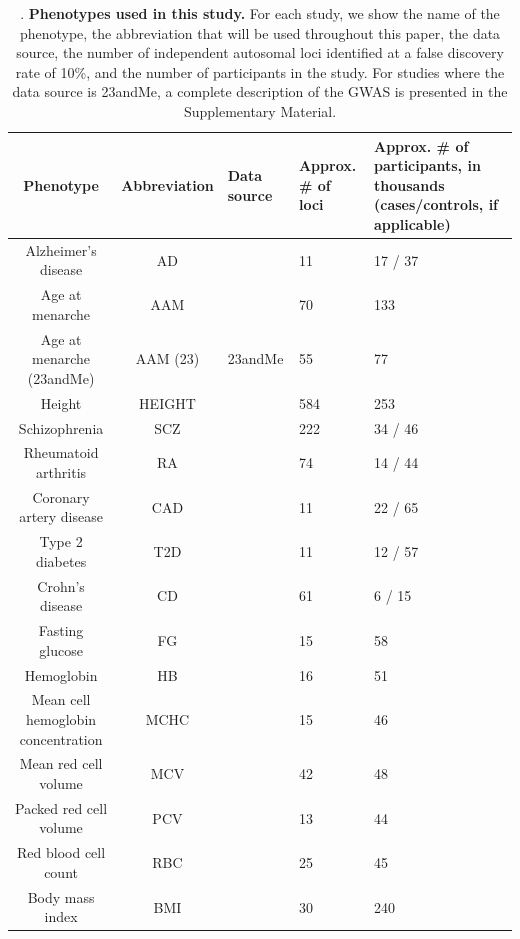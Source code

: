 \documentclass[11pt,titlepage]{article}
\begin{document}
\begin{table}[htdp]
\caption{. \textbf{Phenotypes used in this study.} For each study, we show the name of the phenotype, the abbreviation that will be used throughout this paper, the data source, the number of independent autosomal loci identified at a false discovery rate of 10\%, and the number of participants in the study. For studies where the data source is 23andMe, a complete description of the GWAS is presented in the Supplementary Material.}
\begin{center}
\footnotesize{
\begin{tabular}{|c|c| C{3.5cm}| C{2cm}| C{3cm}| }
\hline
Phenotype & Abbreviation & Data source & Approx. \# of loci & Approx. \# of participants, in thousands (cases/controls, if applicable)\\
\hline
Alzheimer's disease & AD & \citep{Lambert:2013aa} & 11 & 17 / 37\\ 
Age at menarche & AAM &\citep{Perry:2014aa} & 70 & 133 \\ 
Age at menarche (23andMe) & AAM (23) & 23andMe & 55 & 77 \\ 
Height & HEIGHT & \citep{Wood:2014aa} & 584 & 253 \\ 
Schizophrenia & SCZ & \citep{Schizophrenia-Working-Group-of-the-Psychiatric-Genomics-Consortium:2014aa} & 222 & 34  / 46 \\ 
Rheumatoid arthritis & RA & \citep{Okada:2014aa} & 74 &14 / 44 \\ 
Coronary artery disease & CAD & \citep{Schunkert:2011aa} & 11 & 22 / 65\\ 
Type 2 diabetes & T2D & \citep{Morris:2012aa} & 11  & 12 / 57\\ 
Crohn's disease & CD &  \citep{jostins2012host} & 61 & 6 / 15  \\ 
Fasting glucose & FG& \citep{manning2012genome}& 15 & 58 \\ 
Hemoglobin & HB & \citep{van2012seventy} & 16 & 51 \\ 
Mean cell hemoglobin concentration & MCHC & \citep{van2012seventy}& 15 & 46 \\ 
Mean red cell volume & MCV & \citep{van2012seventy} & 42 & 48 \\
Packed red cell volume & PCV & \citep{van2012seventy} & 13 & 44\\
Red blood cell count & RBC & \citep{van2012seventy} & 25  & 45 \\ 
Body mass index & BMI & \citep{Locke:2015aa}  & 30 & 240 \\ 

\end{tabular}}
\end{center}
\end{table}
\end{document}
